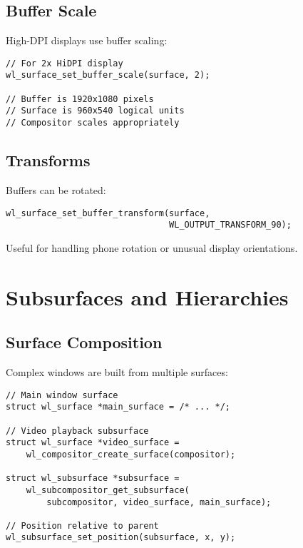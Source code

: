 \subsection{Buffer Scale}

High-DPI displays use buffer scaling:

\begin{lstlisting}[style=cstyle, caption=Buffer Scale]
// For 2x HiDPI display
wl_surface_set_buffer_scale(surface, 2);

// Buffer is 1920x1080 pixels
// Surface is 960x540 logical units
// Compositor scales appropriately
\end{lstlisting}

\subsection{Transforms}

Buffers can be rotated:

\begin{lstlisting}[style=cstyle, caption=Buffer Transform]
wl_surface_set_buffer_transform(surface,
                                WL_OUTPUT_TRANSFORM_90);
\end{lstlisting}

Useful for handling phone rotation or unusual display orientations.

\section{Subsurfaces and Hierarchies}

\subsection{Surface Composition}

Complex windows are built from multiple surfaces:

\begin{lstlisting}[style=cstyle, caption=Creating Subsurfaces]
// Main window surface
struct wl_surface *main_surface = /* ... */;

// Video playback subsurface
struct wl_surface *video_surface =
    wl_compositor_create_surface(compositor);

struct wl_subsurface *subsurface =
    wl_subcompositor_get_subsurface(
        subcompositor, video_surface, main_surface);

// Position relative to parent
wl_subsurface_set_position(subsurface, x, y);
\end{lstlisting}

